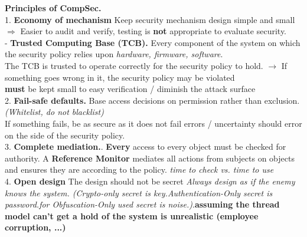 \documentclass[main.tex]{subfiles}
\begin{document}
\noindent \begin{minipage}[t]{0.495\textwidth}
	\noindent \textbf{Principles of CompSec.}\\
	1. \textbf{Economy of mechanism}
	Keep security mechanism design simple and small $\Rightarrow$ Easier to audit and verify, testing is \textbf{not} appropriate to evaluate security.\\
	\noindent - \textbf{Trusted Computing Base (TCB).} Every component of the system on which the security policy relies upon \textit{hardware, firmware, software}. \\The TCB is trusted to operate correctly for the security policy to hold. $\to$ If something goes wrong in it, the security policy may be violated\\
	\textbf{must} be kept small to easy verification / diminish the attack surface\\
	2. \textbf{Fail-safe defaults.} Base access decisions on permission rather than exclusion. \textit{(Whitelist, do not blacklist)} \\
	If something fails, be as secure as it does not fail errors / uncertainty should error on the side of the security policy.\\
	3. \textbf{Complete mediation.}. \textbf{Every} access to every object must be checked for authority. A \textbf{Reference Monitor} mediates all actions from subjects on objects and ensures they are according to the policy. \textit{\warning time to check vs. time to use}\\
	4. \textbf{Open design} The design should not be secret \textit{Always design as if the enemy knows the system. (Crypto-only secret is key.Authentication-Only secret is password.for Obfuscation-Only used secret is noise.)}.\textbf{assuming the thread model can't get a hold of the system is unrealistic (employee corruption, ...)}
\end{minipage}
\hfill
\end{document}
